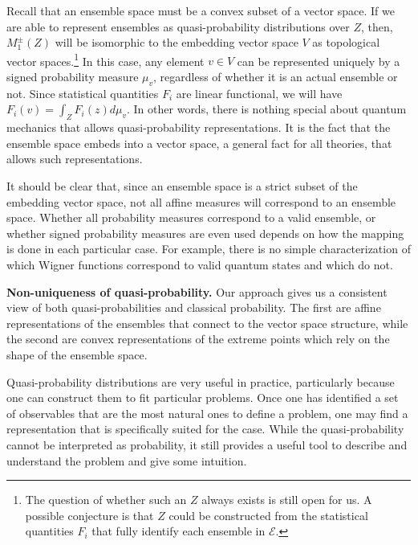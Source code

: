 \documentclass[10pt,twocolumn, nofootinbib]{revtex4-2}
\newcommand{\Ens}[1][E] {\mathcal{#1}} %
\begin{document}
Recall that an ensemble space must be a convex subset of a vector space. If we are able to represent ensembles as quasi-probability distributions over $Z$, then, $M_1^{\pm}(Z)$ will be isomorphic to the embedding vector space $V$ as topological vector spaces.\footnote{The question of whether such an $Z$ always exists is still open for us. A possible conjecture is that $Z$ could be constructed from the statistical quantities $F_i$ that fully identify each ensemble in $\Ens$.} In this case, any element $v\in V$ can be represented uniquely by a signed probability measure $\mu_{v}$, regardless of whether it is an actual ensemble or not. Since statistical quantities $F_i$ are linear functional, we will have $F_i(v) = \int_Z F_i(z) d\mu_{v}$. In other words, there is nothing special about quantum mechanics that allows quasi-probability representations. It is the fact that the ensemble space embeds into a vector space, a general fact for all theories, that allows such representations.

It should be clear that, since an ensemble space is a strict subset of the embedding vector space, not all affine measures will correspond to an ensemble space. Whether all probability measures correspond to a valid ensemble, or whether signed probability measures are even used depends on how the mapping is done in each particular case. For example, there is no simple characterization of which Wigner functions correspond to valid quantum states and which do not.


\textbf{Non-uniqueness of quasi-probability.} Our approach gives us a consistent view of both quasi-probabilities and classical probability. The first are affine representations of the ensembles that connect to the vector space structure, while the second are convex representations of the extreme points which rely on the shape of the ensemble space.

Quasi-probability distributions are very useful in practice, particularly because one can construct them to fit particular problems. Once one has identified a set of observables that are the most natural ones to define a problem, one may find a representation that is specifically suited for the case. While the quasi-probability cannot be interpreted as probability, it still provides a useful tool to describe and understand the problem and give some intuition.
\end{document}
